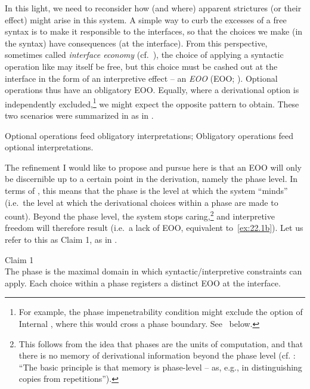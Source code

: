 \documentclass[output=paper]{langsci/langscibook}
\begin{document}
In this light, we need to reconsider how (and where) apparent strictures (or
their effect) might arise in this system. A simple way to curb the excesses of
a free syntax is to make it responsible to the interfaces, so that the choices
we make (in the syntax) have consequences (at the interface). From this
perspective, sometimes called \emph{interface economy} (cf.\
\citealt{Reinhart1995,Fox2000,Chomsky2001,BibRich2006}), the choice of applying
a syntactic operation like \isi{Merge} may itself be free, but this choice must be
cashed out at the interface in the form of an interpretive effect – an
\glsunset{EOO}\emph{\glsdesc{EOO}} (\gls{EOO}; \citealt[34]{Chomsky2001}).
Optional operations thus have an obligatory \gls{EOO}. Equally, where a
derivational option is independently excluded,\footnote{For example, the phase
    impenetrability condition might exclude the option of Internal \isi{Merge},
    where this would cross a phase boundary. See~\Cref{sub:22.2.2}
below.\label{fn:22.2}} we might expect the opposite pattern to obtain. These
two scenarios were summarized in \citet{BibRich2006} as in \REF{ex:22.1}.

\ea\label{ex:22.1}
    \ea\label{ex:22.1a} Optional operations feed obligatory interpretations;
    \ex\label{ex:22.1b} Obligatory operations feed optional interpretations.
    \z
\z

The refinement I would like to propose and pursue here is that an \gls{EOO}
will only be discernible up to a certain point in the derivation, namely the
phase level.  In terms of \citet{BibRich2006}, this means that the phase is the
level at which the system \enquote{minds} (i.e.\ the level at which the
derivational choices within a phase are made to count). Beyond the phase\is{phases} level,
the system stops caring,\footnote{This follows from the idea that phases are
    the units of computation, and that there is no memory of derivational
information beyond the phase\is{phases} level (cf. \citealt[8]{Chomsky2015}: \enquote{The
basic principle is that memory is phase-level -- as, e.g., in distinguishing
copies from repetitions}).\label{fn:22.3}} and interpretive freedom will
therefore result (i.e.\ a lack of \gls{EOO}, equivalent to~\ref{ex:22.1b}).
Let us refer to this as Claim 1, as in \REF{ex:22.2}.

\ea\label{ex:22.2}Claim 1\\
    The phase is the maximal domain in which syntactic\slash interpretive constraints
    can apply. Each choice within a phase\is{phases} registers a distinct \gls{EOO} at the
    interface.
\z
\end{document}
